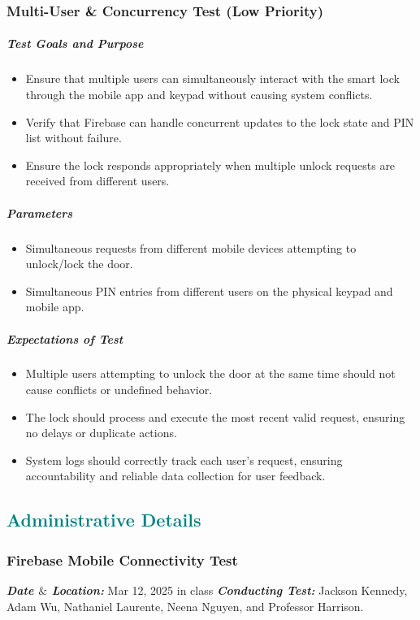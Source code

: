 \documentclass[a4paper,12pt]{article}
\begin{document}
\subsubsection{Multi-User \& Concurrency Test (Low Priority)}
\subparagraph{Test Goals and Purpose}
\begin{itemize}
    \item Ensure that multiple users can simultaneously interact with the smart lock through the mobile app and keypad without causing system conflicts.
    \item Verify that Firebase can handle concurrent updates to the lock state and PIN list without failure.
    \item Ensure the lock responds appropriately when multiple unlock requests are received from different users.
\end{itemize}


\subparagraph{Parameters}
\begin{itemize}
    \item Simultaneous requests from different mobile devices attempting to unlock/lock the door.
    \item Simultaneous PIN entries from different users on the physical keypad and mobile app.
\end{itemize}

\subparagraph{Expectations of Test}
\begin{itemize}
    \item Multiple users attempting to unlock the door at the same time should not cause conflicts or undefined behavior.
    \item The lock should process and execute the most recent valid request, ensuring no delays or duplicate actions.
    \item System logs should correctly track each user’s request, ensuring accountability and reliable data collection for user feedback.
\end{itemize}
\newpage

\textcolor{teal}{\subsection*{Administrative Details}}

\subsubsection{Firebase Mobile Connectivity Test}
\textbf{\textit{Date $\&$ Location:}} Mar 12, 2025 in class
\newline
\textbf{\textit{Conducting Test:}} Jackson Kennedy, Adam Wu, Nathaniel Laurente, Neena Nguyen, and Professor Harrison.
\end{document}
